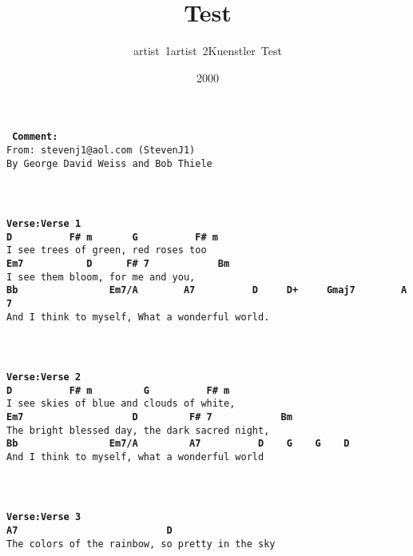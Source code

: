 \documentclass{scrartcl}
\title{Test}
\author{artist~1artist~2Kuenstler~Test}
\date{2000}
\begin{document}
\maketitle
\texttt{
\textbf{Comment:} \\
From:~stevenj1@aol.com~(StevenJ1) \\
By~George~David~Weiss~and~Bob~Thiele \\
 \\
\textbf{ } \\
 \\
\textbf{Verse:Verse 1} \\
\textbf{ \hspace*{5em}D~~~~~~~~~~F\#~m~~~~~~~G~~~~~~~~~~F\#~m~~~} \\
I~see~trees~of~green,~red~roses~too \\
\textbf{ Em7~~~~~~~~~~~D~~~~~~F\#~7~~~~~~~~~~~~Bm~~~~~~~~~~~~~~~~~~~~~~} \\
I~see~them~bloom,~for~me~and~you,~~~~~~~~~~~~~~~~~~ \\
\textbf{ \hspace*{6em}Bb~~~~~~~~~~~~~~~~Em7/A~~~~~~~~A7~~~~~~~~~~D~~~~~D+~~~~~Gmaj7~~~~~~~~A7} \\
And~I~think~to~myself,~What~a~wonderful~world.~~~~~~~~~~~~ \\
 \\
\textbf{ } \\
 \\
\textbf{Verse:Verse 2} \\
\textbf{ \hspace*{5em}D~~~~~~~~~~F\#~m~~~~~~~~~G~~~~~~~~~~F\#~m~~~~~~} \\
I~see~skies~of~blue~and~clouds~of~white, \\
\textbf{ Em7~~~~~~~~~~~~~~~~~~~D~~~~~~~~~F\#~7~~~~~~~~~~~~Bm~~~~~~} \\
The~bright~blessed~day,~the~dark~sacred~night, \\
\textbf{ \hspace*{6em}Bb~~~~~~~~~~~~~~~~Em7/A~~~~~~~~~A7~~~~~~~~~~D~~~~G~~~~G~~~~D~} \\
And~I~think~to~myself,~what~a~wonderful~world~~~~~~~~~ \\
 \\
\textbf{ } \\
 \\
\textbf{Verse:Verse 3} \\
\textbf{ \hspace*{4em}A7~~~~~~~~~~~~~~~~~~~~~~~~~~D~~~~~~~~~~~~~~~~~} \\
The~colors~of~the~rainbow,~so~pretty~in~the~sky \\
}
\end{document}

